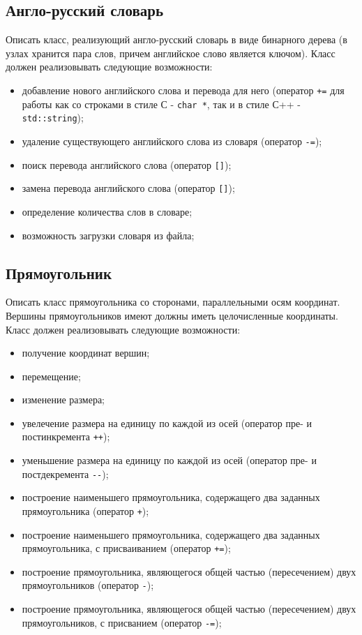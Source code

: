 \documentclass[a4paper,12pt]{article}
\begin{document}
\subsection{Англо-русский словарь}

Описать класс, реализующий англо-русский словарь в виде бинарного
дерева (в узлах хранится пара слов, причем английское слово является
ключом). Класс должен реализовывать следующие возможности:

\begin{itemize}
\item добавление нового английского слова и перевода для него
  (оператор \lstinline|+=| для работы как со строками в стиле С -
  \lstinline|char *|, так и в стиле С++ - \lstinline|std::string|);
\item удаление существующего английского слова из словаря (оператор
  \lstinline|-=|);
\item поиск перевода английского слова (оператор \lstinline|[]|);
\item замена перевода английского слова (оператор \lstinline|[]|);
\item определение количества слов в словаре;
\item возможность загрузки словаря из файла;
\end{itemize}

\subsection{Прямоугольник}

Описать класс прямоугольника со сторонами, параллельными осям
координат. Вершины прямоугольников имеют должны иметь целочисленные
координаты. Класс должен реализовывать следующие возможности:

\begin{itemize}
\item получение координат вершин;
\item перемещение;
\item изменение размера;
\item увелечение размера на единицу по каждой из осей (оператор пре- и
  постинкремента \lstinline|++|);
\item уменьшение размера на единицу по каждой из осей (оператор пре- и
  постдекремента \lstinline|--|);
\item построение наименьшего прямоугольника, содержащего два заданных
  прямоугольника (оператор \lstinline|+|);
\item построение наименьшего прямоугольника, содержащего два заданных
  прямоугольника, с присваиванием (оператор \lstinline|+=|);
\item построение прямоугольника, являющегося общей частью
  (пересечением) двух прямоугольников (оператор \lstinline|-|);
\item построение прямоугольника, являющегося общей частью
  (пересечением) двух прямоугольников, с присванием (оператор
  \lstinline|-=|);
\end{itemize}
\end{document}
